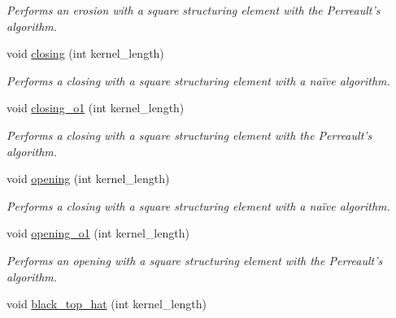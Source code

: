 \begin{DoxyCompactItemize}
\begin{DoxyCompactList}\small\item\em Performs an erosion with a square structuring element with the Perreault's algorithm. \end{DoxyCompactList}\item 
\hypertarget{classofeli_1_1_filters_a01cbcf40deec00feca16f982e3e081a2}{void \hyperlink{classofeli_1_1_filters_a01cbcf40deec00feca16f982e3e081a2}{closing} (int kernel\-\_\-length)}\label{classofeli_1_1_filters_a01cbcf40deec00feca16f982e3e081a2}

\begin{DoxyCompactList}\small\item\em Performs a closing with a square structuring element with a naïve algorithm. \end{DoxyCompactList}\item 
\hypertarget{classofeli_1_1_filters_a04f01e51d6feee4246ede96f767d36c5}{void \hyperlink{classofeli_1_1_filters_a04f01e51d6feee4246ede96f767d36c5}{closing\-\_\-o1} (int kernel\-\_\-length)}\label{classofeli_1_1_filters_a04f01e51d6feee4246ede96f767d36c5}

\begin{DoxyCompactList}\small\item\em Performs a closing with a square structuring element with the Perreault's algorithm. \end{DoxyCompactList}\item 
\hypertarget{classofeli_1_1_filters_aab4788b300a3229c61b7cae344eb2142}{void \hyperlink{classofeli_1_1_filters_aab4788b300a3229c61b7cae344eb2142}{opening} (int kernel\-\_\-length)}\label{classofeli_1_1_filters_aab4788b300a3229c61b7cae344eb2142}

\begin{DoxyCompactList}\small\item\em Performs a closing with a square structuring element with a naïve algorithm. \end{DoxyCompactList}\item 
\hypertarget{classofeli_1_1_filters_a157720e1dbc58827f515de30a18b546a}{void \hyperlink{classofeli_1_1_filters_a157720e1dbc58827f515de30a18b546a}{opening\-\_\-o1} (int kernel\-\_\-length)}\label{classofeli_1_1_filters_a157720e1dbc58827f515de30a18b546a}

\begin{DoxyCompactList}\small\item\em Performs an opening with a square structuring element with the Perreault's algorithm. \end{DoxyCompactList}\item 
\hypertarget{classofeli_1_1_filters_a29dbdd34e2cffc4f37b104f3fab6ead0}{void \hyperlink{classofeli_1_1_filters_a29dbdd34e2cffc4f37b104f3fab6ead0}{black\-\_\-top\-\_\-hat} (int kernel\-\_\-length)}\label{classofeli_1_1_filters_a29dbdd34e2cffc4f37b104f3fab6ead0}


\end{DoxyCompactItemize}
